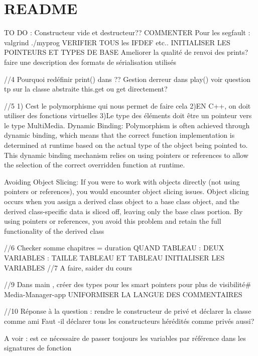 \chapter{README}
\hypertarget{md__r_e_a_d_m_e}{}\label{md__r_e_a_d_m_e}
TO DO \+: Constructeur vide et destructeur?? COMMENTER Pour les segfault \+: valgrind ./myprog VERIFIER TOUS les IFDEF etc.. INITIALISER LES POINTEURS ET TYPES DE BASE Ameliorer la qualité de renvoi des prints? faire une description des formats de sérialisation utilisés

//4 Pourquoi redéfinir print() dans ?? Gestion d\textquotesingle{}erreur dans play() voir question tp sur la classe abstraite this.\+get ou get directement?

//5 1) C\textquotesingle{}est le polymorphisme qui nous permet de faire cela 2)EN C++, on doit utiliser des fonctions virtuelles 3)Le type des éléments doit être un pointeur vers le type Multi\+Media. Dynamic Binding\+: Polymorphism is often achieved through dynamic binding, which means that the correct function implementation is determined at runtime based on the actual type of the object being pointed to. This dynamic binding mechanism relies on using pointers or references to allow the selection of the correct overridden function at runtime.

Avoiding Object Slicing\+: If you were to work with objects directly (not using pointers or references), you would encounter object slicing issues. Object slicing occurs when you assign a derived class object to a base class object, and the derived class-\/specific data is sliced off, leaving only the base class portion. By using pointers or references, you avoid this problem and retain the full functionality of the derived class

//6 Checker somme chapitres = duration QUAND TABLEAU \+: DEUX VARIABLES \+: TAILLE TABLEAU ET TABLEAU INITIALISER LES VARIABLES //7 A faire, s\textquotesingle{}aider du cours

//9 Dans main , créer des types pour les smart pointers pour plus de visibilité\# Media-\/\+Manager-\/app UNIFORMISER LA LANGUE DES COMMENTAIRES

//10 Réponse à la question \+: rendre le constructeur de  privé et déclarer la classe  comme ami Faut -\/il déclarer tous les constructeurs hérédités comme privés aussi?

A voir \+: est ce nécessaire de passer toujours les variables par référence dans les signatures de fonction

